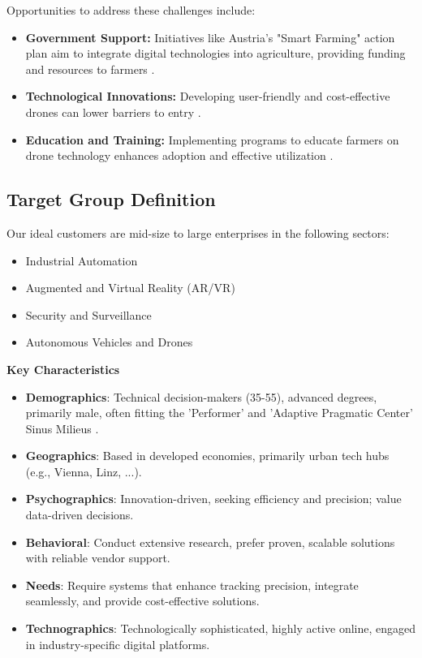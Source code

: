 Opportunities to address these challenges include:

\begin{itemize} \item \textbf{Government Support:} Initiatives like Austria's "Smart Farming" action plan aim to integrate digital technologies into agriculture, providing funding and resources to farmers \citep{smartfarming2023}. \item \textbf{Technological Innovations:} Developing user-friendly and cost-effective drones can lower barriers to entry \citep{guardianagriculture}. \item \textbf{Education and Training:} Implementing programs to educate farmers on drone technology enhances adoption and effective utilization \citep{nazarov2023}. \end{itemize}

\subsection{Target Group Definition}

Our ideal customers are mid-size to large enterprises in the following sectors:

\begin{itemize}
	\item Industrial Automation
	\item Augmented and Virtual Reality (AR/VR)
	\item Security and Surveillance
	\item Autonomous Vehicles and Drones
\end{itemize}

\textbf{Key Characteristics}

\begin{itemize}
	\item \textbf{Demographics}: Technical decision-makers (35-55), advanced degrees, primarily male, often fitting the 'Performer' and 'Adaptive Pragmatic Center' Sinus Milieus \cite{sinus_institut_2024}.
	\item \textbf{Geographics}: Based in developed economies, primarily urban tech hubs (e.g., Vienna, Linz, ...).
	\item \textbf{Psychographics}: Innovation-driven, seeking efficiency and precision; value data-driven decisions.
	\item \textbf{Behavioral}: Conduct extensive research, prefer proven, scalable solutions with reliable vendor support.
	\item \textbf{Needs}: Require systems that enhance tracking precision, integrate seamlessly, and provide cost-effective solutions.
	\item \textbf{Technographics}: Technologically sophisticated, highly active online, engaged in industry-specific digital platforms.
\end{itemize}

